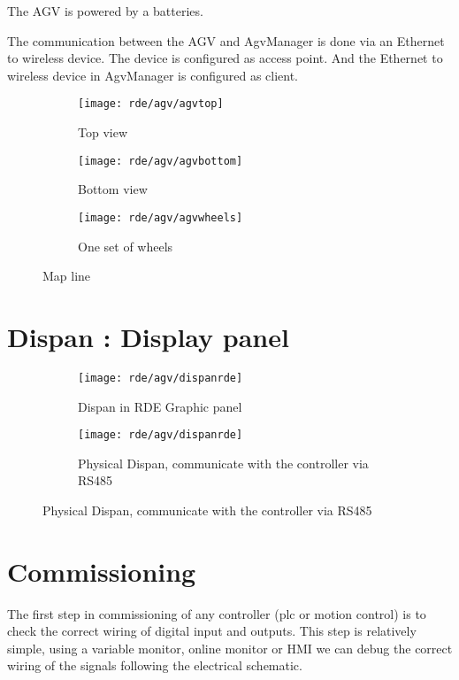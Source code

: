 The AGV is powered by a batteries.

The communication between the AGV and AgvManager is done via an Ethernet to wireless device. The device is configured as access point. And the Ethernet to wireless device in AgvManager is configured as client.

\begin{figure}[h]
	\centering
	\begin{subfigure}{0.4\textwidth}
		\texttt{[image: rde/agv/agvtop]}
		\caption{Top view}
		\label{fig:agvtop}
	\end{subfigure}
	\begin{subfigure}{0.4\textwidth}
		\texttt{[image: rde/agv/agvbottom]}
		\caption{Bottom view}
		\label{fig:agvbottom}
	\end{subfigure}
	
	\begin{subfigure}{0.3\textwidth}
		\texttt{[image: rde/agv/agvwheels]}
		\caption{One set of wheels}
		\label{figagvwheels}
	\end{subfigure}
	\caption{Map line}\label{fig:agv}
\end{figure}

%
\section{Dispan : Display panel}


\begin{figure}[h]
	\centering
	\begin{subfigure}{0.4\textwidth}
	\centering\texttt{[image: rde/agv/dispanrde]}
	\caption{Dispan in RDE Graphic panel}
	\label{figdispanrde}
	\end{subfigure}
	\quad
	\begin{subfigure}{0.4\textwidth}
	\centering\texttt{[image: rde/agv/dispanrde]}
	\caption{Physical Dispan, communicate with the controller via RS485}
	\label{figdispanr}
	\end{subfigure}
\end{figure}
%
\section{Commissioning}
The first step in commissioning of any controller (plc or motion control) is to check the correct wiring of digital input and outputs. This step is relatively simple, using a variable monitor, online monitor or HMI we can debug the correct wiring of the signals following the electrical schematic.

